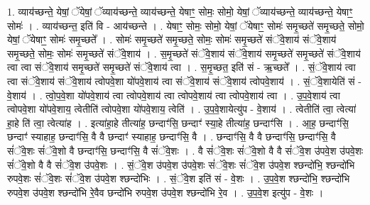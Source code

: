 \documentclass[17pt]{extarticle}
\begin{document}
1. व्याय॑च्छन्ते॒ येषां॒ ॅयेषां॒ ॅव्याय॑च्छन्ते॒ व्याय॑च्छन्ते॒ येषाꣳ॒॒ सोमः॒ सोमो॒ येषां॒ ॅव्याय॑च्छन्ते॒ व्याय॑च्छन्ते॒ येषाꣳ॒॒ सोमः॑ । . व्याय॑च्छन्त॒ इति॑ वि - आय॑च्छन्ते । . येषाꣳ॒॒ सोमः॒ सोमो॒ येषां॒ ॅयेषाꣳ॒॒ सोमः॑ समृ॒च्छते॑ समृ॒च्छते॒ सोमो॒ येषां॒ ॅयेषाꣳ॒॒ सोमः॑ समृ॒च्छते᳚ । . सोमः॑ समृ॒च्छते॑ समृ॒च्छते॒ सोमः॒ सोमः॑ समृ॒च्छते॑ संॅवे॒शाय॑ संॅवे॒शाय॑ समृ॒च्छते॒ सोमः॒ सोमः॑ समृ॒च्छते॑ संॅवे॒शाय॑ । . स॒मृ॒च्छते॑ संॅवे॒शाय॑ संॅवे॒शाय॑ समृ॒च्छते॑ समृ॒च्छते॑ संॅवे॒शाय॑ त्वा त्वा संॅवे॒शाय॑ समृ॒च्छते॑ समृ॒च्छते॑ संॅवे॒शाय॑ त्वा । . स॒मृ॒च्छत॒ इति॑ सं - ऋ॒च्छते᳚ । . सं॒ॅवे॒शाय॑ त्वा त्वा संॅवे॒शाय॑ संॅवे॒शाय॑ त्वोपवे॒शा यो॑पवे॒शाय॑ त्वा संॅवे॒शाय॑ संॅवे॒शाय॑ त्वोपवे॒शाय॑ । . सं॒ॅवे॒शायेति॑ सं - वे॒शाय॑ । . त्वो॒प॒वे॒शा यो॑पवे॒शाय॑ त्वा त्वोपवे॒शाय॑ त्वा त्वोपवे॒शाय॑ त्वा त्वोपवे॒शाय॑ त्वा । . उ॒प॒वे॒शाय॑ त्वा त्वोपवे॒शा यो॑पवे॒शाय॒ त्वेतीति॑ त्वोपवे॒शा यो॑पवे॒शाय॒ त्वेति॑ । . उ॒प॒वे॒शायेत्यु॑प - वे॒शाय॑ । . त्वेतीति॑ त्वा॒ त्वेत्या॑ हा॒हे ति॑ त्वा॒ त्वेत्या॑ह । . इत्या॑हा॒हे तीत्या॑ह॒ छन्दाꣳ॑सि॒ छन्दाꣳ॑ स्या॒हे तीत्या॑ह॒ छन्दाꣳ॑सि । . आ॒ह॒ छन्दाꣳ॑सि॒ छन्दाꣳ॑ स्याहाह॒ छन्दाꣳ॑सि॒ वै वै छन्दाꣳ॑ स्याहाह॒ छन्दाꣳ॑सि॒ वै । . छन्दाꣳ॑सि॒ वै वै छन्दाꣳ॑सि॒ छन्दाꣳ॑सि॒ वै सं॑ॅवे॒शः सं॑ॅवे॒शो वै छन्दाꣳ॑सि॒ छन्दाꣳ॑सि॒ वै सं॑ॅवे॒शः । . वै सं॑ॅवे॒शः सं॑ॅवे॒शो वै वै सं॑ॅवे॒श उ॑पवे॒श उ॑पवे॒शः सं॑ॅवे॒शो वै वै सं॑ॅवे॒श उ॑पवे॒शः । . सं॒ॅवे॒श उ॑पवे॒श उ॑पवे॒शः सं॑ॅवे॒शः सं॑ॅवे॒श उ॑पवे॒श श्छन्दो॑भि॒ श्छन्दो॑भि रुपवे॒शः सं॑ॅवे॒शः सं॑ॅवे॒श उ॑पवे॒श श्छन्दो॑भिः । . सं॒ॅवे॒श इति॑ सं - वे॒शः । . उ॒प॒वे॒श श्छन्दो॑भि॒ श्छन्दो॑भि रुपवे॒श उ॑पवे॒श श्छन्दो॑भि रे॒वैव छन्दो॑भि रुपवे॒श उ॑पवे॒श श्छन्दो॑भि रे॒व । . उ॒प॒वे॒श इत्यु॑प - वे॒शः । \newline
\end{document}
